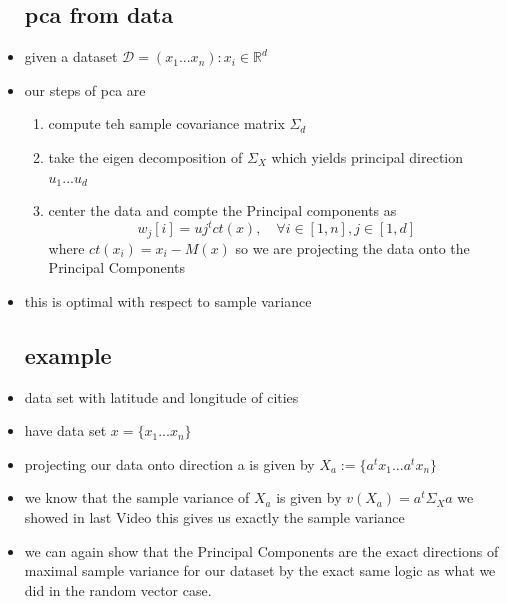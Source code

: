 \documentclass{article}
\begin{document}
\begin{itemize}
\subsection*{pca from data}
\item given a dataset $\mathcal{D}=(x_1...x_n) : x_i\in \mathbb{R}^{d}$
\item our steps of pca are 
\begin{enumerate}
    \item compute teh sample covariance matrix $\Sigma_{d}$
    \item take the eigen decomposition of $\Sigma_{X}$ which yields principal direction $u_1...u_d$
    \item center the data and compte the Principal components as $$w_j[i]=uj^{t}ct(x), \quad \forall i\in [1,n], j\in [1,d]$$ where $ct(x_i)=x_i-M(x)$ so we are projecting the data onto the Principal Components
\end{enumerate}
\item this is optimal with respect to sample variance
\subsection*{example}
\item data set with latitude and longitude of cities 
\item have data set $x=\{x_1...x_n\}$
\item projecting our data onto direction a  is given by $X_{a}:=\{a^tx_1...a^tx_n\}$
\item we know that the sample variance of $X_a$ is given by $v(X_a)=a^t\Sigma_X a$ we showed in last Video this gives us exactly the sample variance
\item we can again show that the Principal Components are the exact directions of maximal sample variance for our dataset by the exact same logic as what we did in the random vector case. 

\end{itemize}
\end{document}
